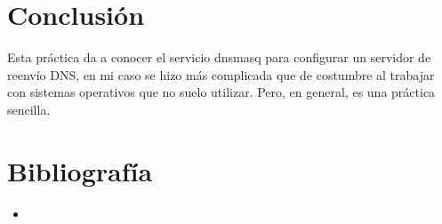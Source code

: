 \documentclass[12pt,twocolumn]{article}
\begin{document}
\section{Conclusión}

Esta práctica da a conocer el servicio dnsmasq para configurar un servidor de reenvío DNS, en mi caso se hizo más complicada que de costumbre al trabajar con sistemas operativos que no suelo utilizar. Pero, en general, es una práctica sencilla.

\section{Bibliografía}

\begin{itemize}
\setlength\itemsep{-0.3em}
\item 
\end{itemize}
\end{document}
